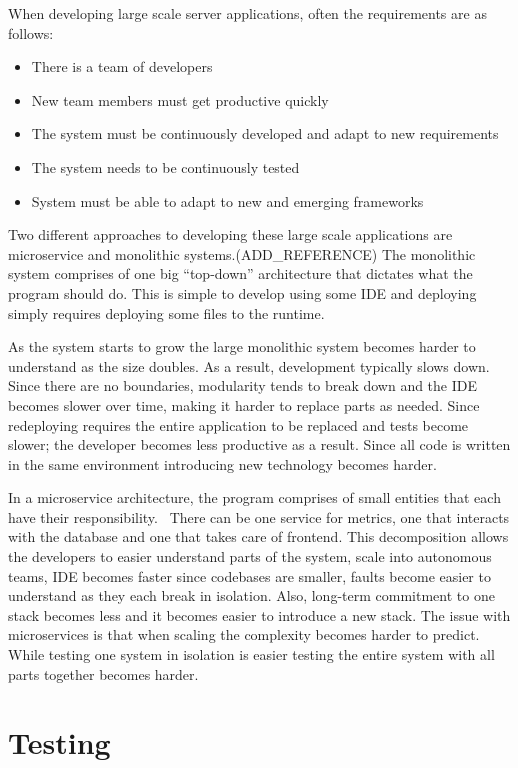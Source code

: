 When developing large scale server applications, often the requirements are as
follows:

\begin{itemize}
    \item There is a team of developers
    \item New team members must get productive quickly
    \item The system must be continuously developed and adapt to new
        requirements
    \item The system needs to be continuously tested
    \item System must be able to adapt to new and emerging frameworks
\end{itemize}

Two different approaches to developing these large scale applications are
microservice and monolithic systems.(ADD\_REFERENCE) The monolithic system
comprises of one big ``top-down'' architecture that dictates what the program
should do. This is simple to develop using some IDE and deploying simply
requires deploying some files to the runtime. 

As the system starts to grow the large monolithic system becomes harder to
understand as the size doubles. As a result, development typically slows down.
Since there are no boundaries, modularity tends to break down and the IDE
becomes slower over time, making it harder to replace parts as needed. Since
redeploying requires the entire application to be replaced and tests become
slower; the developer becomes less productive as a result. Since all code is
written in the same environment introducing new technology becomes harder.

In a microservice architecture, the program comprises of small entities that each
have their responsibility.~\cite{chenlianping} There can be one service for
metrics, one that interacts with the database and one that takes care of
frontend. This decomposition allows the developers to easier understand parts of
the system, scale into autonomous teams, IDE becomes faster since codebases are
smaller, faults become easier to understand as they each break in isolation.
Also, long-term commitment to one stack becomes less and it becomes easier to
introduce a new stack.  The issue with microservices is that when scaling the
complexity becomes harder to predict. While testing one system in isolation is
easier testing the entire system with all parts together becomes harder.

\section{Testing}

